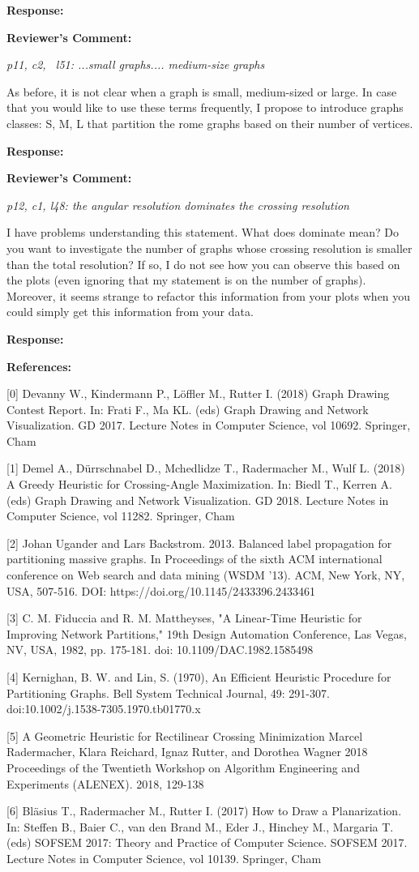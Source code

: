 \documentclass{article}
\newcommand{\tcomment}[1]{\vspace{0.3cm} {\color{red} \item \textbf{Reviewer's Comment:} {\em #1}}}
\newcommand{\response}{\vspace{0.2cm} \textbf{Response: }}
\begin{document}
\begin{itemize}
\response{}

\tcomment{p11, c2, ~l51: ...small graphs.... medium-size graphs

As before, it is not clear when a graph is small, medium-sized or large. In case that you would like to use these terms frequently, I propose to introduce graphs classes: S, M, L that partition the rome graphs based on their number of vertices.}

\response{}

\tcomment{p12, c1, l48: the angular resolution dominates the crossing resolution

I have problems understanding this statement. What does dominate mean?  Do you want to investigate the number of graphs whose crossing resolution is smaller than the total resolution? If so, I do not see how you can observe this based on the plots (even ignoring that my statement is on the number of graphs). Moreover, it seems strange to refactor this information from your plots when you could simply get this information from your data.}

\response{}
        
\end{itemize} 

\textbf{References:}

[0] Devanny W., Kindermann P., Löffler M., Rutter I. (2018) Graph Drawing Contest Report. In: Frati F., Ma KL. (eds) Graph Drawing and Network Visualization. GD 2017. Lecture Notes in Computer Science, vol 10692. Springer, Cham

[1] Demel A., Dürrschnabel D., Mchedlidze T., Radermacher M., Wulf L. (2018) A Greedy Heuristic for Crossing-Angle Maximization. In: Biedl T., Kerren A. (eds) Graph Drawing and Network Visualization. GD 2018. Lecture Notes in Computer Science, vol 11282. Springer, Cham

[2] Johan Ugander and Lars Backstrom. 2013. Balanced label propagation for partitioning massive graphs. In Proceedings of the sixth ACM international conference on Web search and data mining (WSDM '13). ACM, New York, NY, USA, 507-516. DOI: https://doi.org/10.1145/2433396.2433461 

[3] C. M. Fiduccia and R. M. Mattheyses, "A Linear-Time Heuristic for Improving Network Partitions," 19th Design Automation Conference, Las Vegas, NV, USA, 1982, pp. 175-181.
doi: 10.1109/DAC.1982.1585498

[4] Kernighan, B. W. and Lin, S. (1970), An Efficient Heuristic Procedure for Partitioning Graphs. Bell System Technical Journal, 49: 291-307. doi:10.1002/j.1538-7305.1970.tb01770.x

[5]  A Geometric Heuristic for Rectilinear Crossing Minimization
Marcel Radermacher, Klara Reichard, Ignaz Rutter, and Dorothea Wagner
2018 Proceedings of the Twentieth Workshop on Algorithm Engineering and Experiments (ALENEX). 2018, 129-138 

[6] Bläsius T., Radermacher M., Rutter I. (2017) How to Draw a Planarization. In: Steffen B., Baier C., van den Brand M., Eder J., Hinchey M., Margaria T. (eds) SOFSEM 2017: Theory and Practice of Computer Science. SOFSEM 2017. Lecture Notes in Computer Science, vol 10139. Springer, Cham
\end{document}

